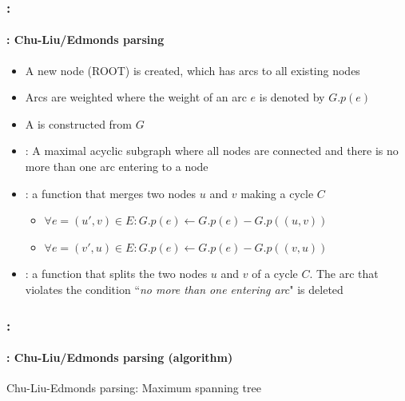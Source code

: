 \documentclass[xcolor=table]{beamer}
\begin{document}
\begin{frame}
	\frametitle{\insertshortsubtitle: \insertsection}
	\framesubtitle{\insertsubsection: Chu-Liu/Edmonds parsing}

	\begin{itemize}
		\item A new node (ROOT) is created, which has arcs to all existing nodes 
		\item Arcs are weighted where the weight of an arc $e$ is denoted by $G.p(e)$
		\item A  is constructed from $G$
		\item {}: A maximal acyclic subgraph where all nodes are connected and there is no more than one arc entering to a node
		\item {}: a function that merges two nodes $u$ and $v$ making a cycle $C$
		\begin{itemize}
			\item $\forall e = (u', v) \in E : G.p(e) \leftarrow G.p(e) - G.p((u, v)) $
			\item $\forall e = (v', u) \in E : G.p(e) \leftarrow G.p(e) - G.p((v, u)) $
		\end{itemize}
		\item {}: a function that splits the two nodes $u$ and $v$ of a cycle $C$. The arc that violates the condition ``\textit{no more than one entering arc}" is deleted
	\end{itemize}
 
\end{frame}

\begin{frame}
	\frametitle{\insertshortsubtitle: \insertsection}
	\framesubtitle{\insertsubsection: Chu-Liu/Edmonds parsing (algorithm)}


	\begin{block}{Chu-Liu-Edmonds parsing: Maximum spanning tree}
		\scriptsize\vspace{-3pt}
		\begin{algorithm}[H]
			
			
		\end{algorithm}
	\end{block}

\end{frame}
\end{document}
